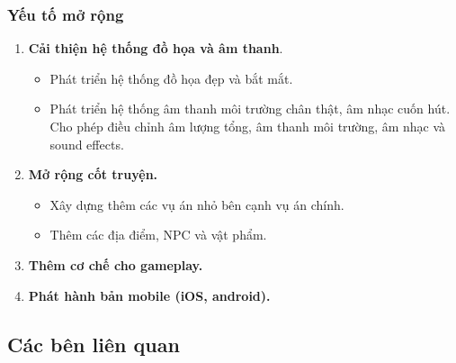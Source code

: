 \subsubsection{Yếu tố mở rộng}
\begin{enumerate}
    \item \textbf{Cải thiện hệ thống đồ họa và âm thanh}.
    \begin{itemize}
        \item Phát triển hệ thống đồ họa đẹp và bắt mắt. 
        
        \item Phát triển hệ thống âm thanh môi trường chân thật, âm nhạc cuốn hút. Cho phép điều chỉnh âm lượng tổng, âm thanh môi trường, âm nhạc và sound effects. 
    \end{itemize}

    \item \textbf{Mở rộng cốt truyện.}
    \begin{itemize}
        \item Xây dựng thêm các vụ án nhỏ bên cạnh vụ án chính.

        \item Thêm các địa điểm, NPC và vật phẩm.
    \end{itemize}

    \item \textbf{Thêm cơ chế cho gameplay.}
    \item \textbf{Phát hành bản mobile (iOS, android).}
\end{enumerate}

\subsection{Các bên liên quan}

